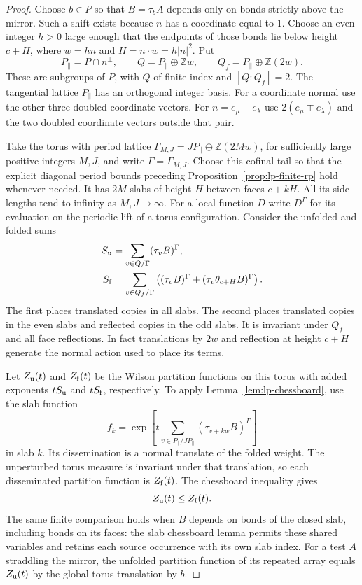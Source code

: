 \documentclass[11pt,letterpaper,reqno]{amsart}
\numberwithin{equation}{section}
\theoremstyle{definition}
\theoremstyle{remark}
\begin{document}
\begin{proof}
Choose \(b\in P\) so that \(B=\tau_b A\) depends only on bonds strictly
above the mirror. Such a shift exists because \(n\) has a coordinate
equal to \(1\). Choose an even integer \(h>0\) large enough that
the endpoints of those bonds lie below height \(c+H\), where
\(w=hn\) and \(H=n\cdot w=h|n|^2\). Put
\[
 P_\parallel=P\cap n^\perp,\qquad
 Q=P_\parallel\oplus\mathbb Zw,\qquad
 Q_f=P_\parallel\oplus\mathbb Z(2w).
\]
These are subgroups of \(P\), with \(Q\) of finite index and
\([Q:Q_f]=2\). The tangential lattice \(P_\parallel\) has an
orthogonal integer basis. For a coordinate normal use the other
three doubled coordinate vectors. For \(n=e_\mu\pm e_\lambda\)
use \(2(e_\mu\mp e_\lambda)\) and the two doubled coordinate
vectors outside that pair.

Take the torus with period lattice
\(\Gamma_{M,J}=JP_\parallel\oplus\mathbb Z(2Mw)\), for sufficiently
large positive integers \(M,J\), and write \(\Gamma=\Gamma_{M,J}\).
Choose this cofinal tail so that the explicit diagonal period bounds
preceding Proposition~\ref{prop:lp-finite-rp} hold whenever needed.
It has \(2M\) slabs of height \(H\) between faces \(c+kH\).
All its side lengths tend to infinity as \(M,J\to\infty\).
For a local function \(D\) write \(D^\Gamma\) for its evaluation
on the periodic lift of a torus configuration. Consider the
unfolded and folded sums
\begin{align*}
 S_{\rm u}
   &=\sum_{v\in Q/\Gamma}(\tau_v B)^\Gamma,\\
 S_{\rm f}
   &=\sum_{v\in Q_f/\Gamma}
      \left((\tau_v B)^\Gamma+
            (\tau_v\theta_{c+H}B)^\Gamma\right).
\end{align*}
The first places translated copies in all slabs. The second
places translated copies in the even slabs and reflected copies
in the odd slabs. It is invariant under \(Q_f\) and all face
reflections. In fact translations by \(2w\) and reflection at
height \(c+H\) generate the normal action used to place its terms.

Let \(Z_{\rm u}(t)\) and \(Z_{\rm f}(t)\) be the Wilson partition
functions on this torus with added exponents \(tS_{\rm u}\) and
\(tS_{\rm f}\), respectively. To apply Lemma~\ref{lem:lp-chessboard},
use the slab function
\[
 f_k=\exp\!\left[t\sum_{v\in P_\parallel/JP_\parallel}
                          (\tau_{v+kw}B)^\Gamma\right]
\]
in slab \(k\). Its dissemination is a normal translate of the
folded weight. The unperturbed torus measure is invariant under
that translation, so each disseminated partition function is
\(Z_{\rm f}(t)\). The chessboard inequality gives
\begin{equation}\label{lp:eq-fold-partition}
                         Z_{\rm u}(t)\le Z_{\rm f}(t).
\end{equation}
The same finite comparison holds when \(B\) depends on bonds
of the closed slab, including bonds on its faces: the slab
chessboard lemma permits these shared variables and retains each
source occurrence with its own slab index.
For a test \(A\) straddling the mirror, the unfolded partition
function of its repeated array equals \(Z_{\rm u}(t)\) by the
global torus translation by \(b\).


\end{proof}
\end{document}
